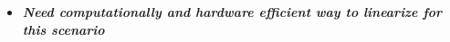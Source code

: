 \documentclass[25pt]{tikzposter} %
\begin{document}
\begin{columns}
{\begin{itemize}
\begin{itemize}
				\end{itemize}			
			\item{\textbf{\textit{Need computationally and hardware efficient way to linearize for this scenario}}} 
			\end{itemize}}
\end{columns}
\end{document}
